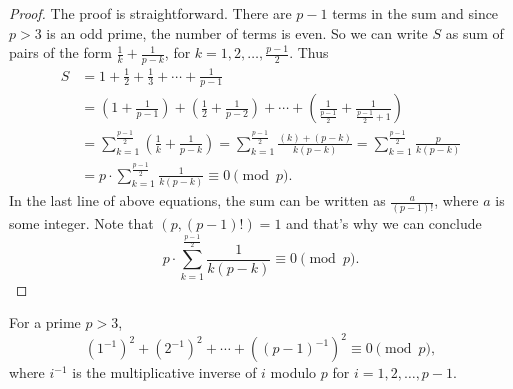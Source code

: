 \documentclass[12pt]{subfile}
\begin{document}
		\begin{proof}
			The proof is straightforward. There are $p-1$ terms in the sum and since $p>3$ is an odd prime, the number of terms is even. So we can write $S$ as sum of pairs of the form $ \frac{1}{k} +‌\frac{1}{p-k}$, for $k=1, 2, \ldots, \frac{p-1}{2}$. Thus
			\begin{align*}
				S &= 1+\frac{1}{2}+ \frac{1}{3}+\cdots+ \frac{1}{p-1}\\
				&= \left(1 + \frac{1}{p-1}\right) +‌\left(\frac{1}{2} + \frac{1}{p-2}\right) + \cdots + \left(\frac{1}{\frac{p-1}{2}} + \frac{1}{\frac{p-1}{2}+1}\right)\\
				&= \sum_{k=1}^{\frac{p-1}{2}} \left(\frac{1}{k}+\frac{1}{p-k} \right) = \sum_{k=1}^{\frac{p-1}{2}} \frac{(k) + (p-k)}{k(p-k)} = \sum_{k=1}^{\frac{p-1}{2}} \frac{p}{k(p-k)}\\
				&=p \cdot \sum_{k=1}^{\frac{p-1}{2}} \frac{1}{k(p-k)} \equiv 0 \pmod p.
			\end{align*}
			In the last line of above equations, the sum can be written as $\frac{a}{(p-1)!}$, where $a$ is some integer. Note that $(p, (p-1)!)=1$ and that's why we can conclude
				\begin{equation*}
					p \cdot \sum_{k=1}^{\frac{p-1}{2}} \frac{1}{k(p-k)} \equiv 0 \pmod p.
				\end{equation*}
		\end{proof}
		
		\begin{lemma}\label{lem:wolstproof2} For a prime $p>3$,
			\[(1^{-1})^2+(2^{-1})^2+\cdots+((p-1)^{-1})^2 \equiv 0 \pmod p,\] where $i^{-1}$ is the multiplicative inverse of $i$ modulo $p$ for $i=1,2,\ldots,p-1$.
		\end{lemma}
		
\end{document}
